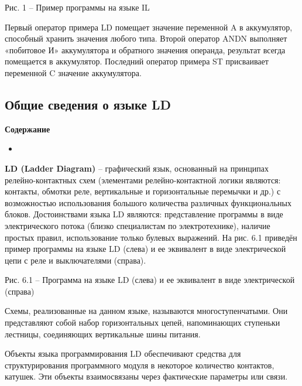 \documentclass[letterpaper,10pt,russian]{sphinxmanual}
\begin{document}

Рис. 1 – Пример программы на языке IL

Первый оператор примера LD помещает значение переменной A в аккумулятор,
способный хранить значения любого типа. Второй оператор ANDN выполняет
«побитовое И» аккумулятора и обратного значения операнда, результат
всегда помещается в аккумулятор. Последний оператор примера ST
присваивает переменной C значение аккумулятора.


\subsection{Общие сведения о языке LD}
\label{iec_guide/ld_guide:ld}\label{iec_guide/ld_guide::doc}
\begin{sphinxShadowBox}
\textbf{Содержание}

\medskip

\begin{itemize}
\item {} 
\label{iec_guide/ld_guide:id2}{\hyperref[iec_guide/ld_guide:ld]{}}

\end{itemize}
\end{sphinxShadowBox}

\textbf{LD (Ladder Diagram)} – графический язык, основанный на принципах
релейно-контактных схем (элементами релейно-контактной логики являются:
контакты, обмотки реле, вертикальные и горизонтальные перемычки и др.) с
возможностью использования большого количества различных функциональных
блоков. Достоинствами языка LD являются: представление программы в виде
электрического потока (близко специалистам по электротехнике), наличие
простых правил, использование только булевых выражений. На рис. 6.1
приведён пример программы на языке LD (слева) и ее эквивалент в виде
электрической цепи с реле и выключателями (справа).


Рис. 6.1 – Программа на языке LD (слева) и ее эквивалент в виде
электрической (справа)

Схемы, реализованные на данном языке, называются многоступенчатыми. Они
представляют собой набор горизонтальных цепей, напоминающих ступеньки
лестницы, соединяющих вертикальные шины питания.

Объекты языка программирования LD обеспечивают средства для
структурирования программного модуля в некоторое количество контактов,
катушек. Эти объекты взаимосвязаны через фактические параметры или
связи.
\end{document}
